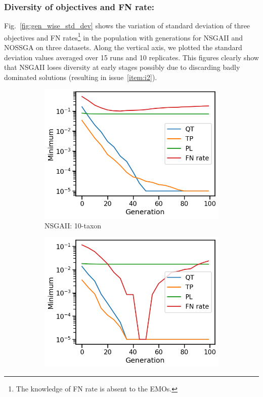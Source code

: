 \subsubsection{Diversity of objectives and FN rate:}\label{subsubsec:diversity} Fig.~\ref{fig:gen_wise_std_dev} shows the variation of standard deviation of three objectives and FN rates\footnote{The knowledge of FN rate is absent to the EMOs.} in the population with generations for NSGAII and NOSSGA on three datasets. Along the vertical axis, we plotted the standard deviation values averaged over 15 runs and 10 replicates. This figures clearly show that NSGAII loses diversity at early stages possibly due to discarding badly dominated solutions (resulting in issue~\ref{item:i2}).    

\begin{figure}[!htbp]
	\centering
	\begin{adjustwidth}{-1cm}{-1cm}
		\begin{subfigure}[b]{0.4\textwidth}
			\includegraphics[width=\textwidth]{Figure/10-taxon_NSGAII_minimum}
			\caption{NSGAII: 10-taxon}
		\end{subfigure}%
		\begin{subfigure}[b]{0.4\textwidth}
			\includegraphics[width=\textwidth]{Figure/11-taxon_NSGAII_minimum}

\end{subfigure}
\end{adjustwidth}
\end{figure}
